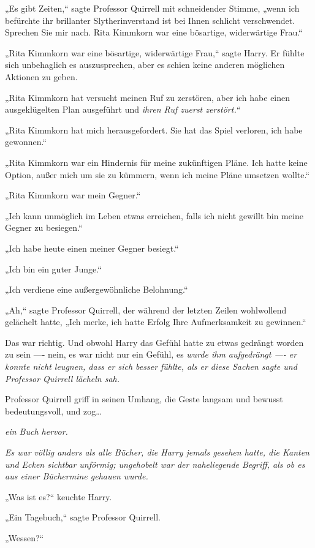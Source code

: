 {„Es gibt Zeiten,“ sagte Professor Quirrell mit schneidender Stimme, „wenn ich befürchte ihr brillanter Slytherinverstand ist bei Ihnen schlicht verschwendet. Sprechen Sie mir nach. Rita Kimmkorn war eine bösartige, widerwärtige Frau.“

„Rita Kimmkorn war eine bösartige, widerwärtige Frau,“ sagte Harry. Er fühlte sich unbehaglich es auszusprechen, aber es schien keine anderen möglichen Aktionen zu geben.

„Rita Kimmkorn hat versucht meinen Ruf zu zerstören, aber ich habe einen ausgeklügelten Plan ausgeführt und \emph{ihren Ruf zuerst zerstört.“}

„Rita Kimmkorn hat mich herausgefordert. Sie hat das Spiel verloren, ich habe gewonnen.“

„Rita Kimmkorn war ein Hindernis für meine zukünftigen Pläne. Ich hatte keine Option, außer mich um sie zu kümmern, wenn ich meine Pläne umsetzen wollte.“

„Rita Kimmkorn war mein Gegner.“

„Ich kann unmöglich im Leben etwas erreichen, falls ich nicht gewillt bin meine Gegner zu besiegen.“

„Ich habe heute einen meiner Gegner besiegt.“

„Ich bin ein guter Junge.“

„Ich verdiene eine außergewöhnliche Belohnung.“

„Ah,“ sagte Professor Quirrell, der während der letzten Zeilen wohlwollend gelächelt hatte, „Ich merke, ich hatte Erfolg Ihre Aufmerksamkeit zu gewinnen.“

Das war richtig. Und obwohl Harry das Gefühl hatte zu etwas gedrängt worden zu sein ---- nein, es war nicht nur ein Gefühl, es \emph{wurde ihm aufgedrängt ---- er konnte nicht leugnen, dass er sich besser fühlte, als er diese Sachen sagte und Professor Quirrell lächeln sah.}

Professor Quirrell griff in seinen Umhang, die Geste langsam und bewusst bedeutungsvoll, und zog…

\emph{ein Buch hervor.}

\emph{Es war völlig anders als alle Bücher, die Harry jemals gesehen hatte, die Kanten und Ecken sichtbar unförmig; ungehobelt war der naheliegende Begriff, als ob es aus einer Büchermine gehauen wurde.}

„Was ist es?“ keuchte Harry.

„Ein Tagebuch,“ sagte Professor Quirrell.

„Wessen?“

}
